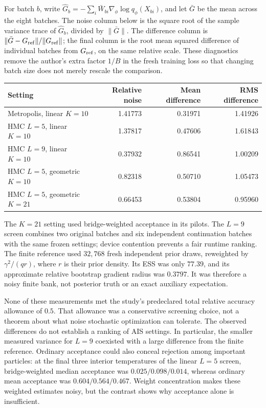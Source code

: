 For batch $b$, write $\widehat G_b=-\sum_i\bar W_{bi}
\nabla_\phi\log q_\phi(X_{bi})$, and let $\bar G$ be the mean across the
eight batches. The noise column below is the square root of the sample
variance trace of $\widehat G_b$, divided by $\|\bar G\|$. The difference
column is $\|\bar G-G_{\rm ref}\|/\|G_{\rm ref}\|$; the final column is
the root mean squared difference of individual batches from $G_{\rm ref}$,
on the same relative scale. These diagnostics remove the author's extra
factor $1/B$ in the fresh training loss so that changing batch size does not
merely rescale the comparison.
\begin{center}
\small
\begin{tabular}{lrrr}
\toprule
Setting & Relative noise & Mean difference & RMS difference \\
\midrule
Metropolis, linear $K=10$ & 1.41773 & 0.31971 & 1.41926 \\
HMC $L=5$, linear $K=10$ & 1.37817 & 0.47606 & 1.61843 \\
HMC $L=9$, linear $K=10$ & 0.37932 & 0.86541 & 1.00209 \\
HMC $L=5$, geometric $K=10$ & 0.82318 & 0.50710 & 1.05473 \\
HMC $L=5$, geometric $K=21$ & 0.66453 & 0.53804 & 0.95960 \\
\bottomrule
\end{tabular}
\end{center}
The $K=21$ setting used bridge-weighted acceptance in its pilots. The $L=9$
screen combines two original batches and six independent continuation
batches with the same frozen settings; device contention prevents a fair
runtime ranking. The finite reference used $32{,}768$ fresh independent prior
draws, reweighted by $\gamma^2/(qr)$, where $r$ is their prior density. Its
ESS was only $77.39$, and its approximate relative bootstrap gradient radius
was $0.3797$. It was therefore a noisy finite bank, not posterior truth or an
exact auxiliary expectation.

None of these measurements met the study's predeclared total relative
accuracy allowance of $0.5$. That allowance was a conservative screening
choice, not a theorem about what noise stochastic optimization can tolerate.
The observed differences do not establish a ranking of AIS settings.
In particular, the smaller measured variance for $L=9$ coexisted with a
large difference from the finite reference. Ordinary acceptance could also
conceal rejection among important particles: at the final three interior
temperatures of the linear $L=5$ screen, bridge-weighted median acceptance
was $0.025/0.098/0.014$, whereas ordinary mean acceptance was
$0.604/0.564/0.467$. Weight concentration makes these weighted estimates
noisy, but the contrast shows why acceptance alone is insufficient.

